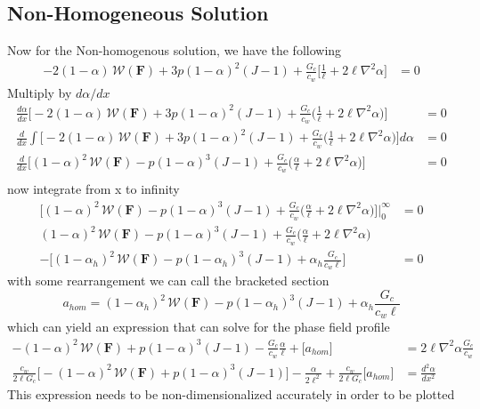 \documentclass[12pt,3p]{article}
\numberwithin{equation}{section}
\begin{document}
\subsection{Non-Homogeneous Solution}
Now for the Non-homogenous solution, we have the following
\begin{align*}
- 2 (1 - \alpha) \, \mathcal{W} (\mathbf{F}) + 3 p (1-\alpha)^2 (J-1) + \frac{G_{c}}{c_{w}} \bigg[ \frac{1}{\ell} + 2 \ell \nabla^2 \alpha \bigg] &= 0 
\end{align*}
Multiply by $d \alpha / dx$
\begin{align*}
\frac{d \alpha}{d x} \bigg[ - 2 (1 - \alpha) \, \mathcal{W} (\mathbf{F}) + 3 p (1-\alpha)^2 (J-1) + \frac{G_{c}}{c_{w}} \bigg( \frac{1}{\ell} + 2 \ell \nabla^2 \alpha \bigg) \bigg] &= 0 \\
\frac{d}{d x} \int \bigg[ - 2 (1 - \alpha) \, \mathcal{W} (\mathbf{F}) + 3 p (1-\alpha)^2 (J-1) + \frac{G_{c}}{c_{w}} \bigg( \frac{1}{\ell} + 2 \ell \nabla^2 \alpha \bigg) \bigg] d \alpha &= 0 \\
\frac{d}{d x} \bigg[ (1 - \alpha)^2 \, \mathcal{W} (\mathbf{F}) - p (1-\alpha)^3 (J-1) + \frac{G_{c}}{c_{w}} \bigg( \frac{\alpha}{\ell} + 2 \ell \nabla^2 \alpha \bigg) \bigg] &= 0 \\
\end{align*}
now integrate from x to infinity
\begin{align*}
\bigg[ (1 - \alpha)^2 \, \mathcal{W} (\mathbf{F}) - p (1-\alpha)^3 (J-1) + \frac{G_{c}}{c_{w}} \bigg( \frac{\alpha}{\ell} + 2 \ell \nabla^2 \alpha \bigg) \bigg] \bigg\rvert_0^{\infty} &= 0 \\
(1 - \alpha)^2 \, \mathcal{W} (\mathbf{F}) - p (1-\alpha)^3 (J-1) + \frac{G_{c}}{c_{w}} \bigg( \frac{\alpha}{\ell} + 2 \ell \nabla^2 \alpha \bigg) & \\
- \bigg[ (1 - \alpha_h)^2 \, \mathcal{W} (\mathbf{F}) - p (1-\alpha_h)^3 (J-1) + \alpha_h \frac{G_{c}}{c_{w} \ell} \bigg] &= 0
\end{align*}
with some rearrangement we can call the bracketed section 
\begin{equation}
a_{hom} = (1 - \alpha_h)^2 \, \mathcal{W} (\mathbf{F}) - p (1-\alpha_h)^3 (J-1) + \alpha_h \frac{G_{c}}{c_{w} \ell} 
\end{equation}
which can yield an expression that can solve for the phase field profile
\begin{align*}
-(1 - \alpha)^2 \, \mathcal{W} (\mathbf{F}) + p (1-\alpha)^3 (J-1) - \frac{G_{c}}{c_{w}} \frac{\alpha}{\ell} + \bigg[ a_{hom} \bigg] &= 2 \ell \nabla^2 \alpha \frac{G_{c}}{c_{w}} \\
\frac{c_w}{ 2 \ell G_c} \bigg[ -(1 - \alpha)^2 \, \mathcal{W} (\mathbf{F}) + p (1-\alpha)^3 (J-1) \bigg] - \frac{\alpha}{2 \ell^2} + \frac{c_w}{2 \ell G_c} \bigg[ a_{hom} \bigg] &= \frac{d^2 \alpha}{dx^2}
\end{align*}
This expression needs to be non-dimensionalized accurately in order to be plotted
\end{document}
